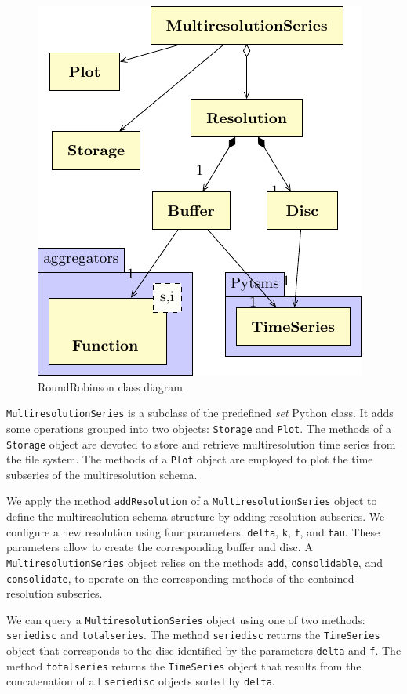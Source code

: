 \begin{figure}[tp]
  \centering
  \includegraphics{fig_roundrobinson_uml.pdf}
  \caption{RoundRobinson  class diagram}
  \label{fig:implementacio:roundrobinson-uml}
\end{figure}

\texttt{MultiresolutionSeries} is a subclass of the predefined
\emph{set} Python class. It adds some operations grouped into two
objects: \texttt{Storage} and \texttt{Plot}. The methods of a
\texttt{Storage} object are devoted to store and retrieve
multiresolution time series from the file system. The methods of a
\texttt{Plot} object are employed to plot the time subseries of the
multiresolution schema.

We apply the method \texttt{addResolution} of a
\texttt{MultiresolutionSeries} object to define the multiresolution
schema structure by adding resolution subseries. We configure a new
resolution using four parameters: \texttt{delta}, \texttt{k},
\texttt{f}, and \texttt{tau}. These parameters allow to create the
corresponding buffer and disc. A \texttt{MultiresolutionSeries} object
relies on the methods \texttt{add}, \texttt{consolidable}, and
\texttt{consolidate}, to operate on the corresponding methods of the
contained resolution subseries.

We can query a \texttt{MultiresolutionSeries} object using one of two
methods: \texttt{seriedisc} and \texttt{totalseries}. The method
\texttt{seriedisc} returns the \texttt{TimeSeries} object that
corresponds to the disc identified by the parameters \texttt{delta}
and \texttt{f}. The method \texttt{totalseries} returns the
\texttt{TimeSeries} object that results from the concatenation of all
\texttt{seriedisc} objects sorted by \texttt{delta}.

